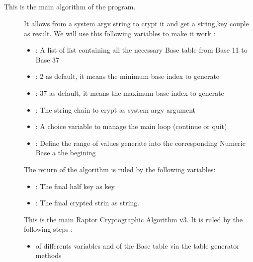\documentclass[letterpaper,10pt,english]{sphinxmanual}
\begin{document}
\subsection{}
\label{\detokenize{Description of Crypterv3.1:algorithm}}\begin{description}
\item[{This is the main algorithm of the program.}] \leavevmode
\sphinxAtStartPar
It allows from a system argv string to crypt it and get a string,key couple as result.
We will use this following variables to make it work :
\begin{itemize}
\item {} 
\sphinxAtStartPar
{} : A list of list containing all the necessary Base table from Base 11 to Base 37

\item {} 
\sphinxAtStartPar
{} : 2 as default, it means the minimum base index to generate

\item {} 
\sphinxAtStartPar
{} :  37 as default, it means the maximum base index to generate

\item {} 
\sphinxAtStartPar
{} : The string chain to crypt as system argv argument

\item {} 
\sphinxAtStartPar
{} : A choice variable to manage the main loop (continue or quit)

\item {} 
\sphinxAtStartPar
{} : Define the range of values generate into the corresponding Numeric Base a the begining

\end{itemize}

\sphinxAtStartPar
The return of the algorithm is ruled by the following variables:
\begin{itemize}
\item {} 
\sphinxAtStartPar
{} : The final half key as key

\item {} 
\sphinxAtStartPar
{} : The final crypted strin as string.

\end{itemize}

\sphinxAtStartPar
This is the main Raptor Cryptographic Algorithm v3. It is ruled by the following steps :
\begin{itemize}
\item {} 
\sphinxAtStartPar
{} of differents variables and of the Base table via the table generator methods


\end{itemize}
\end{description}
\end{document}
